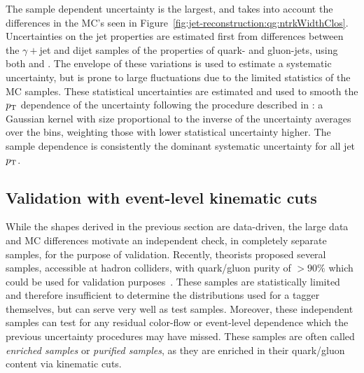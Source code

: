 The sample dependent uncertainty is the largest, and takes into account the differences in the MC's seen in Figure~\ref{fig:jet-reconstruction:qg:ntrkWidthClos}. 
Uncertainties on the jet properties are estimated first from differences
between the $\gamma+$jet and dijet samples of the properties of quark- and gluon-jets, using both \Pythia and \Herwigpp. The envelope of these
variations is used to estimate a systematic uncertainty, but is prone to large fluctuations due to the limited statistics of the MC samples. These statistical 
uncertainties
are estimated and used to smooth the $p_{\text{T}}$ dependence of the uncertainty following the
procedure described in \cite{JES2011}: a Gaussian kernel with size proportional to the inverse of the uncertainty averages over the \pt bins, weighting those with lower statistical uncertainty higher. 
The sample dependence is consistently the dominant systematic uncertainty for all jet $p_{\text{T}}$.

\subsection{Validation with event-level kinematic cuts}
\label{jet-reconstruction:qg:validation}

While the shapes derived in the previous section are data-driven, the large data and MC differences motivate an independent check, in completely separate samples, for the purpose of validation. Recently, theorists proposed several samples, accessible at hadron colliders, with quark/gluon purity of $> 90\%$ which could be used for validation purposes~\cite{schwartz2}. These samples are statistically limited and therefore insufficient to determine the distributions used for a tagger themselves, but can serve very well as test samples. Moreover, these independent samples can test for any residual color-flow or event-level dependence which the previous uncertainty procedures may have missed. These samples are often called \textit{enriched samples} or \textit{purified samples}, as they are enriched in their quark/gluon content via kinematic cuts.

